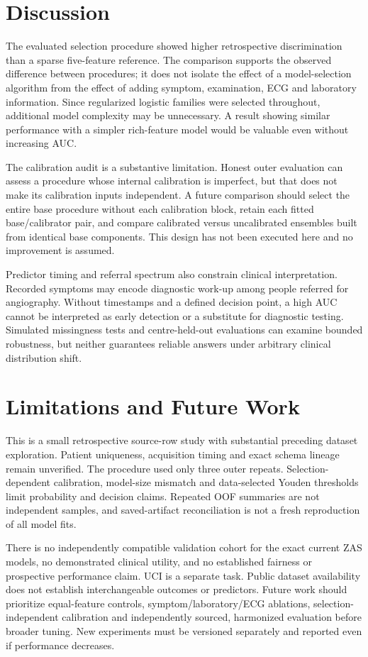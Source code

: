 \documentclass[conference]{IEEEtran}
\begin{document}
\section{Discussion}
The evaluated selection procedure showed higher retrospective discrimination than a sparse five-feature reference. The comparison supports the observed difference between procedures; it does not isolate the effect of a model-selection algorithm from the effect of adding symptom, examination, ECG and laboratory information. Since regularized logistic families were selected throughout, additional model complexity may be unnecessary. A result showing similar performance with a simpler rich-feature model would be valuable even without increasing AUC.

The calibration audit is a substantive limitation. Honest outer evaluation can assess a procedure whose internal calibration is imperfect, but that does not make its calibration inputs independent. A future comparison should select the entire base procedure without each calibration block, retain each fitted base/calibrator pair, and compare calibrated versus uncalibrated ensembles built from identical base components. This design has not been executed here and no improvement is assumed.

Predictor timing and referral spectrum also constrain clinical interpretation. Recorded symptoms may encode diagnostic work-up among people referred for angiography. Without timestamps and a defined decision point, a high AUC cannot be interpreted as early detection or a substitute for diagnostic testing. Simulated missingness tests and centre-held-out evaluations can examine bounded robustness, but neither guarantees reliable answers under arbitrary clinical distribution shift.

\section{Limitations and Future Work}
This is a small retrospective source-row study with substantial preceding dataset exploration. Patient uniqueness, acquisition timing and exact schema lineage remain unverified. The procedure used only three outer repeats. Selection-dependent calibration, model-size mismatch and data-selected Youden thresholds limit probability and decision claims. Repeated OOF summaries are not independent samples, and saved-artifact reconciliation is not a fresh reproduction of all model fits.

There is no independently compatible validation cohort for the exact current ZAS models, no demonstrated clinical utility, and no established fairness or prospective performance claim. UCI is a separate task. Public dataset availability does not establish interchangeable outcomes or predictors. Future work should prioritize equal-feature controls, symptom/laboratory/ECG ablations, selection-independent calibration and independently sourced, harmonized evaluation before broader tuning. New experiments must be versioned separately and reported even if performance decreases.
\end{document}
